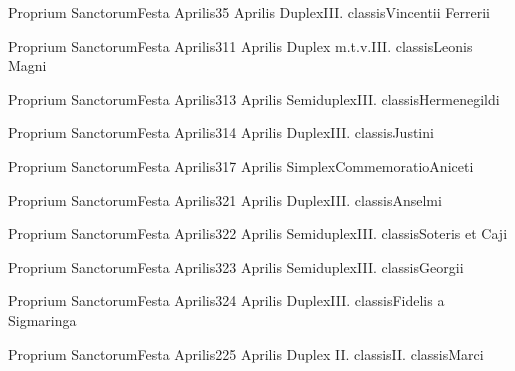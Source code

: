 \documentclass[psalterium-feriale.tex]{subfiles}
\begin{document}
	{Proprium Sanctorum}{Festa Aprilis}{3}{5 Aprilis}
	{Duplex}{III. classis}{Vincentii Ferrerii}
	{}
	{}

	{Proprium Sanctorum}{Festa Aprilis}{3}{11 Aprilis}
	{Duplex m.t.v.}{III. classis}{Leonis Magni}
	{}
	{}

	{Proprium Sanctorum}{Festa Aprilis}{3}{13 Aprilis}
	{Semiduplex}{III. classis}{Hermenegildi}
	{}
	{}

	{Proprium Sanctorum}{Festa Aprilis}{3}{14 Aprilis}
	{Duplex}{III. classis}{Justini}
	{}
	{}

	{Proprium Sanctorum}{Festa Aprilis}{3}{17 Aprilis}
	{Simplex}{Commemoratio}{Aniceti}
	{}
	{}

	{Proprium Sanctorum}{Festa Aprilis}{3}{21 Aprilis}
	{Duplex}{III. classis}{Anselmi}
	{}
	{}

	{Proprium Sanctorum}{Festa Aprilis}{3}{22 Aprilis}
	{Semiduplex}{III. classis}{Soteris et Caji}
	{}
	{}

	{Proprium Sanctorum}{Festa Aprilis}{3}{23 Aprilis}
	{Semiduplex}{III. classis}{Georgii}
	{}
	{}

	{Proprium Sanctorum}{Festa Aprilis}{3}{24 Aprilis}
	{Duplex}{III. classis}{Fidelis a Sigmaringa}
	{}
	{}

	{Proprium Sanctorum}{Festa Aprilis}{2}{25 Aprilis}
	{Duplex II. classis}{II. classis}{Marci}
	{}
	{}
\psalmodiapropria
\end{document}
